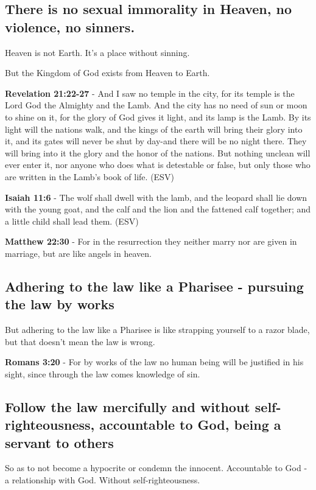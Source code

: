 \documentclass[11pt]{article}
\begin{document}
\subsection{There is no sexual immorality in Heaven, no violence, no sinners.}
\label{sec:org917ffb8}
Heaven is not Earth. It's a place without sinning.

But the Kingdom of God exists from Heaven to Earth.

\textbf{Revelation 21:22-27} - And I saw no temple in the city, for its temple is the Lord God the Almighty and the Lamb. And the city has no need of sun or moon to shine on it, for the glory of God gives it light, and its lamp is the Lamb. By its light will the nations walk, and the kings of the earth will bring their glory into it, and its gates will never be shut by day-and there will be no night there. They will bring into it the glory and the honor of the nations. But nothing unclean will ever enter it, nor anyone who does what is detestable or false, but only those who are written in the Lamb's book of life. (ESV)

\textbf{Isaiah 11:6} - The wolf shall dwell with the lamb, and the leopard shall lie down with the young goat, and the calf and the lion and the fattened calf together; and a little child shall lead them. (ESV)

\textbf{Matthew 22:30} - For in the resurrection they neither marry nor are given in marriage, but are like angels in heaven.

\subsection{Adhering to the law like a Pharisee - pursuing the law by works}
\label{sec:orgb22be9c}
But adhering to the law like a Pharisee is like strapping yourself to a razor blade, but that doesn't mean the law is wrong.

\textbf{Romans 3:20} - For by works of the law no human being will be justified in his sight, since through the law comes knowledge of sin.

\subsection{Follow the law mercifully and without self-righteousness, accountable to God, being a servant to others}
\label{sec:org5cfc03c}
So as to not become a hypocrite or condemn the innocent.
Accountable to God - a relationship with God.
Without self-righteousness.
\end{document}
